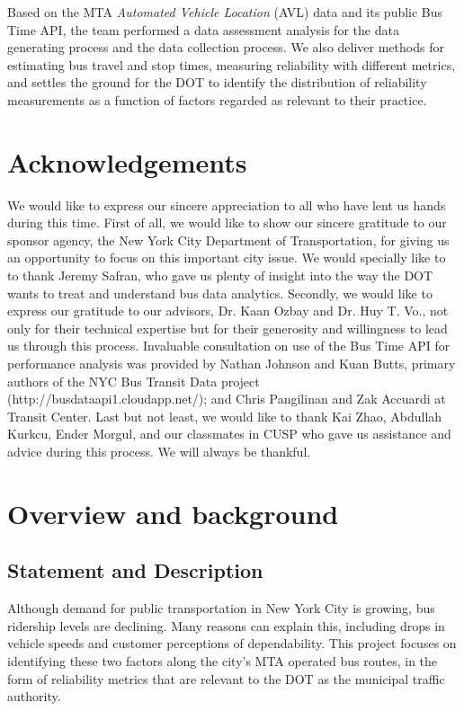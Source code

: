 \documentclass[12pt]{report}
\begin{document}
Based on the MTA \textit{Automated Vehicle Location} (AVL) data and its public Bus Time API, the team performed a data assessment analysis for the data generating process and the data collection process. We also deliver methods for estimating bus travel and stop times, measuring reliability with different metrics, and settles the ground for the DOT to identify the distribution of reliability measurements as a function of factors regarded as relevant to their practice.
        
\section*{Acknowledgements}

We would like to express our sincere appreciation to all who have lent us hands during this time.  First of all, we would like to show our sincere gratitude to our sponsor agency, the New York City Department of Transportation, for giving us an opportunity to focus on this important city issue.  We would specially like to to thank Jeremy Safran, who gave us plenty of insight into the way the DOT wants to treat and understand bus data analytics.  Secondly, we would like to express our gratitude to our advisors, Dr. Kaan Ozbay and Dr. Huy T. Vo., not only for their technical expertise but for their generosity and willingness to lead us through this process.  Invaluable consultation on use of the Bus Time API for performance analysis was provided by Nathan Johnson and Kuan Butts, primary authors of the NYC Bus Transit Data project (http://busdataapi1.cloudapp.net/); and Chris Pangilinan and Zak Accuardi at Transit Center.  Last but not least, we would like to thank Kai Zhao, Abdullah Kurkcu, Ender Morgul, and our classmates in CUSP who gave us assistance and advice during this process.  We will always be thankful.


\newpage

\section{Overview and background}


\subsection{	Statement and Description}
Although demand for public transportation in New York City is growing, bus ridership levels are declining.  Many reasons can explain this, including drops in vehicle speeds and customer perceptions of dependability.  This project focuses on identifying these two factors along the city's MTA operated bus routes, in the form of reliability metrics that are relevant to the DOT as the municipal traffic authority.
\end{document}
